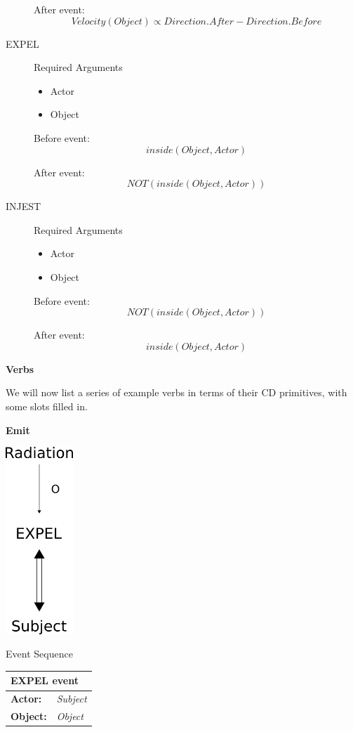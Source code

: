 \documentclass[../dissertation]{subfiles}
\begin{document}
\begin{description}
After event:
\[Velocity(Object) \propto \textit{Direction.After} - \textit{Direction.Before}\]

\item[EXPEL]\hfill

Required Arguments
\begin{itemize}
	\item Actor
    \item Object
\end{itemize}

Before event:
\[inside(Object, Actor)\]

After event:
\[NOT(inside(Object, Actor))\]

\item[INJEST]\hfill

Required Arguments
\begin{itemize}
	\item Actor
    \item Object
\end{itemize}


Before event:
\[NOT(inside(Object, Actor))\]

After event:
\[inside(Object, Actor)\]
\end{description}

\newpage

\textbf{Verbs}

We will now list a series of example verbs in terms of their CD primitives, with some slots filled in.

\textbf{Emit}

\smallskip

\begin{center}
	\includegraphics[height=200pt]{emit-cd.png}
\end{center}

Event Sequence
\begin{center}

    \begin{tabular}{l l}
      \toprule
      \multicolumn{2}{l}{\textbf{EXPEL event}}\\
      \hline
      \textbf{Actor:} & \textit{Subject}\\
      \textbf{Object:} & \textit{Object}\\
      \bottomrule
    \end{tabular}
\end{center}
\end{document}
